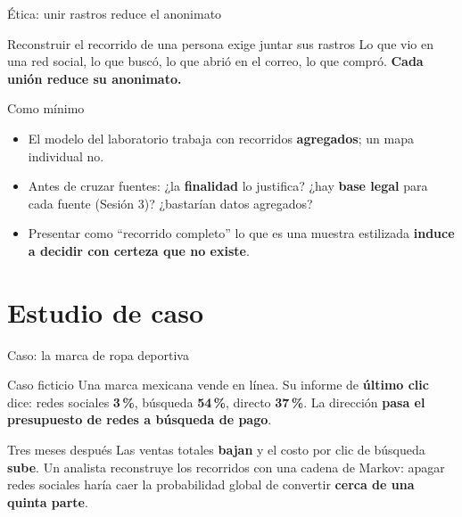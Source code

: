 \documentclass[aspectratio=169,xcolor=dvipsnames]{beamer}
\begin{document}
\begin{frame}{Ética: unir rastros reduce el anonimato}
\begin{alertblock}{Reconstruir el recorrido de una persona exige juntar sus rastros}
  Lo que vio en una red social, lo que buscó, lo que abrió en el correo, lo que compró. \textbf{Cada unión reduce su anonimato.}
\end{alertblock}
\begin{block}{Como mínimo}
  \begin{itemize}
    \item El modelo del laboratorio trabaja con recorridos \textbf{agregados}; un mapa individual no.
    \item Antes de cruzar fuentes: ¿la \textbf{finalidad} lo justifica? ¿hay \textbf{base legal} para cada fuente (Sesión 3)? ¿bastarían datos agregados?
    \item Presentar como \enquote{recorrido completo} lo que es una muestra estilizada \textbf{induce a decidir con certeza que no existe}.
  \end{itemize}
\end{block}
\end{frame}

\section[Caso]{Estudio de caso}

\begin{frame}{Caso: la marca de ropa deportiva}
\begin{exampleblock}{Caso ficticio}
  Una marca mexicana vende en línea. Su informe de \textbf{último clic} dice: redes sociales \textbf{3\,\%}, búsqueda \textbf{54\,\%}, directo \textbf{37\,\%}. La dirección \textbf{pasa el presupuesto de redes a búsqueda de pago}.
\end{exampleblock}
\begin{alertblock}{Tres meses después}
  Las ventas totales \textbf{bajan} y el costo por clic de búsqueda \textbf{sube}. Un analista reconstruye los recorridos con una cadena de Markov: apagar redes sociales haría caer la probabilidad global de convertir \textbf{cerca de una quinta parte}.
\end{alertblock}
\end{frame}
\end{document}
